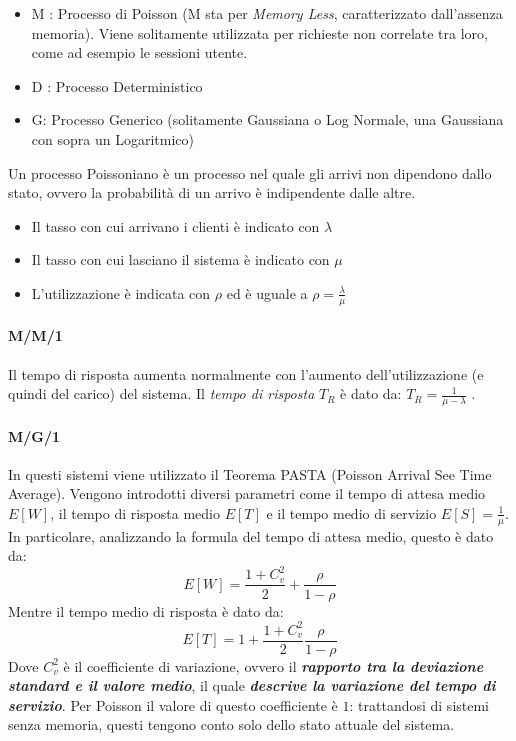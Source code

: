 \documentclass{article}
\providecommand{\tightlist}{%
		  \setlength{\itemsep}{0pt}\setlength{\parskip}{0pt}}
\begin{document}
		\begin{itemize}
			\tightlist
			\item
			M : Processo di Poisson (M sta per \emph{Memory
				Less}, caratterizzato dall'assenza memoria). Viene solitamente
			utilizzata per richieste non correlate tra loro, come
			ad esempio le sessioni utente.
			\item
			D : Processo Deterministico
			\item
			G: Processo Generico (solitamente Gaussiana o
			Log Normale, una Gaussiana con sopra un Logaritmico)
		\end{itemize}
		
		Un processo Poissoniano è un processo nel quale gli arrivi non dipendono dallo stato, ovvero la probabilità di un arrivo è indipendente dalle altre.
		\begin{itemize}
			\item Il tasso con cui arrivano i clienti è indicato con \(\lambda\)
			\item Il tasso con cui lasciano il sistema è indicato con \(\mu\)
			\item L'utilizzazione è indicata con \(\rho\) ed è uguale a \(\rho = \frac{\lambda}{\mu}\)
		\end{itemize}
		
		\paragraph{M/M/1}\label{mm1}
		Il tempo di risposta aumenta normalmente con l'aumento
		dell'utilizzazione (e quindi del carico) del sistema. Il \emph{tempo di
			risposta} \(T_R\) è dato da: \(T_R = \frac{1}{\mu-\lambda}\) .
		
		\paragraph{M/G/1}\label{mg1}
				
		In questi sistemi viene utilizzato il Teorema PASTA
		(Poisson Arrival See Time Average). Vengono introdotti diversi
		parametri come il tempo di attesa medio \(E[W]\), il
		tempo di risposta medio \(E[T]\) e il
		tempo medio di servizio \(E[S]=\frac{1}{\mu}\). In
		particolare, analizzando la formula del tempo di attesa medio, questo è
		dato da: \[
		E[W] = \frac{1+C_v^2}{2}+\frac{\rho}{1-\rho}
		\]
		Mentre il tempo medio di risposta è dato da:
		\[
		E[T] = 1+\frac{1+C_v^2}{2}\frac{\rho}{1-\rho}
		\]
		Dove \(C_v^2\) è il coefficiente di variazione,
		ovvero il \textbf{\emph{rapporto tra la deviazione standard e il valore
				medio}}, il quale \textbf{\emph{descrive la variazione del tempo di
				servizio}}. Per Poisson il valore di questo coefficiente è \(1\):
		trattandosi di sistemi senza memoria, questi tengono conto solo dello
		stato attuale del sistema.
		
\end{document}

